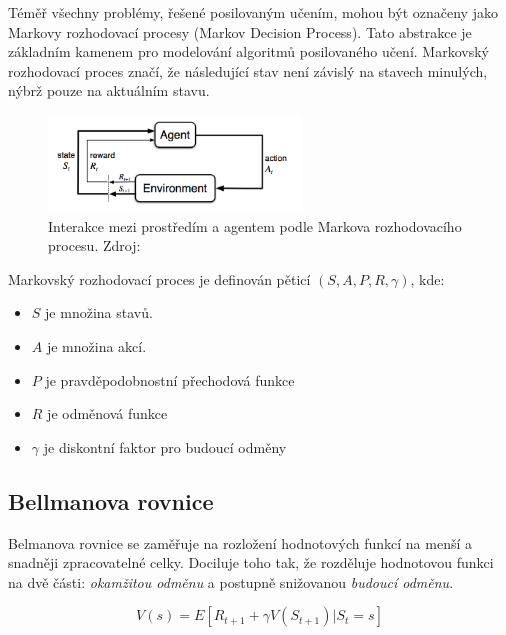 Téměř všechny problémy, řešené posilovaným učením, mohou být označeny jako Markovy rozhodovací procesy (Markov Decision Process).
Tato abstrakce je základním kamenem pro modelování algoritmů posilovaného učení.
Markovský rozhodovací proces značí, že následující stav není závislý na stavech minulých, nýbrž pouze na aktuálním stavu.

\begin{figure}[H]
	\centering
	\includegraphics[width=0.6\textwidth]{obrazky-figures/RL_basics}
	\caption{Interakce mezi prostředím a agentem podle Markova rozhodovacího procesu.
  Zdroj: \cite{RL_basics}}\label{fig:markov}
\end{figure}

\begin{definition}
  
Markovský rozhodovací proces je definován pěticí $(S, A, P, R, \gamma)$\cite{RL_basics}, kde:

\begin{itemize}
\item $S$ je množina stavů.
\item $A$ je množina akcí.
\item $P$ je pravděpodobnostní přechodová funkce
\item $R$ je odměnová funkce
\item $\gamma$ je diskontní faktor pro budoucí odměny
\end{itemize}
\end{definition}

\subsection{Bellmanova rovnice}\label{subsec:bellmanova-rovnice}

Belmanova rovnice se zaměřuje na rozložení hodnotových funkcí na menší a snadněji zpracovatelné celky.
Dociluje toho tak, že rozděluje hodnotovou funkci na dvě části: \emph{okamžitou odměnu} a postupně snižovanou \emph{budoucí odměnu}.

\begin{equation}
  V(s) = E[R_{t+1} + \gamma V(S_{t+1}) | S_t = s]\label{eq:bellman1}
\end{equation}

